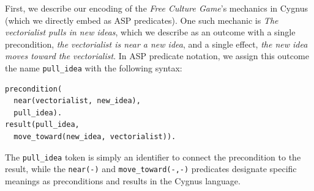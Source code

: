 \documentclass[a4paper]{article}
\begin{document}
First, we describe our encoding of the \textit{Free Culture Game}'s mechanics in
Cygnus (which we directly embed as ASP predicates). One such mechanic is
{\em The vectorialist pulls in new ideas}, which we describe as an outcome
with a single precondition, {\em the vectorialist is near a new idea}, and
a single effect, {\em the new idea moves toward the vectorialist}. In ASP
predicate notation, we assign this outcome the name \verb|pull_idea| with
the following syntax:

\begin{verbatim}
precondition(
  near(vectorialist, new_idea), 
  pull_idea).
result(pull_idea, 
  move_toward(new_idea, vectorialist)).
\end{verbatim}

The \verb|pull_idea| token is simply an identifier to connect the
precondition to the result, while the \verb|near(-)| and
\verb|move_toward(-,-)| predicates designate specific meanings as preconditions and results in the Cygnus language.
\end{document}
